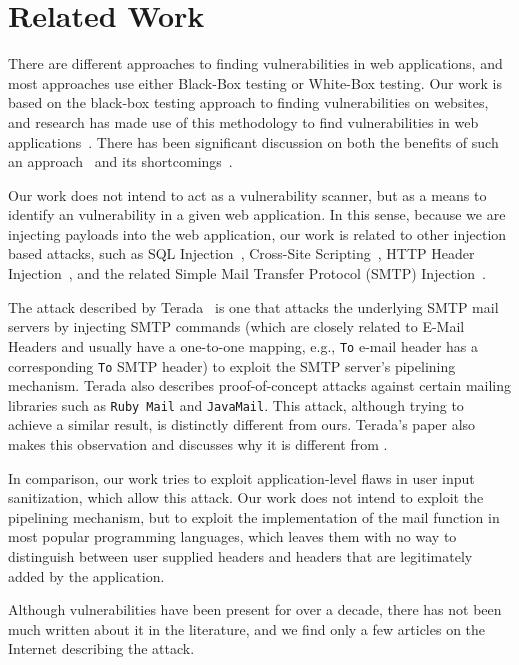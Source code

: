 \section{Related Work}

There are different approaches to finding vulnerabilities in web applications, and most approaches use either Black-Box testing or White-Box testing.
Our work is based on the black-box testing approach to finding vulnerabilities on websites, and research has made use of this methodology to find vulnerabilities in web applications~\cite{Beizer:1995:BTT:202699,Huang,kals2006secubat,payet13:ears-in-the-wild,zanero2005automatic}. There has been significant discussion on both the benefits of such an approach~\cite{black-box} and its shortcomings~\cite{Doupe2012,Doupe2010}.

Our work does not intend to act as a vulnerability scanner, but as a means to identify an \ehi vulnerability in a given web application. In this sense, because we are injecting payloads into the web application, our work is related to other injection based attacks, such as SQL Injection~\cite{sql1,sql0,sql2}, Cross-Site Scripting~\cite{Injection1,KleinAmit}, HTTP Header Injection~\cite{sessionride}, and the related Simple Mail Transfer Protocol (SMTP) Injection~\cite{Terada2015}.

The attack described by Terada~\cite{Terada2015} is one that attacks the underlying SMTP mail servers by injecting SMTP commands (which are closely related to E-Mail Headers and usually have a one-to-one mapping, e.g., \texttt{To} e-mail header has a corresponding \texttt{To} SMTP header) to exploit the SMTP server's pipelining mechanism. Terada also describes proof-of-concept attacks against certain mailing libraries such as \texttt{Ruby Mail} and \texttt{JavaMail}. This attack, although trying to achieve a similar result, is distinctly different from ours. Terada's paper also makes this observation and discusses why it is different from \ehi.

In comparison, our work tries to exploit application-level flaws in user input sanitization, which allow this attack. Our work does not intend to exploit the pipelining mechanism, but to exploit the implementation of the mail function in most popular programming languages, which leaves them with no way to distinguish between user supplied headers and headers that are legitimately added by the application.

Although \ehi vulnerabilities have been present for over a decade, there has not been much written about it in the literature, and we find only a few articles on the Internet describing the attack.

